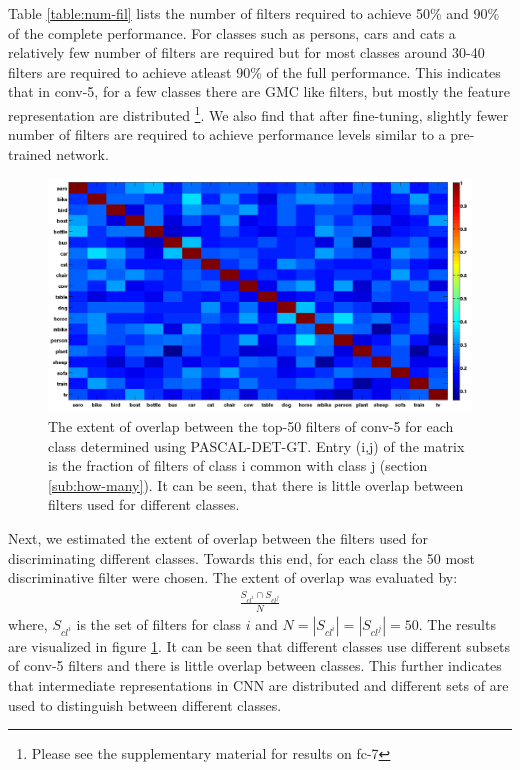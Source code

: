 Table \ref{table:num-fil} lists the number of filters required to achieve 50\% and 90\% of the complete performance. For classes such as persons, cars and cats a relatively few number of filters are required but for most classes around 30-40 filters are required to achieve atleast 90\% of the full performance. This indicates that in conv-5, for a few classes there are GMC like filters, but mostly the feature representation are distributed \footnote{Please see the supplementary material for results on fc-7}. We also find that after fine-tuning, slightly fewer number of filters are required to achieve performance levels similar to a pre-trained network. 

\begin{figure}[t!]
\centering
\includegraphics[width=1.0\linewidth]{images/ftNet_commonfilters.png}
\caption{The extent of overlap between the top-50 filters of conv-5 for each class determined using PASCAL-DET-GT.
Entry (i,j) of the matrix is the fraction of filters of class i common with class j (section \ref{sub:how-many}). It can be seen, that there is little overlap between filters used for different classes.}
\label{fig:overlap}
\end{figure}

Next, we estimated the extent of overlap between the filters used for discriminating different classes. Towards this end, for each class the 50 most discriminative filter were chosen. The extent of overlap was evaluated by:
\begin{align}
\frac{S_{cl^i} \cap S_{cl^j}}{N}
\end{align}
where, $S_{cl^i}$ is the set of filters for class $i$ and $N = |S_{cl^i}| = |S_{cl^j}| = 50$. The results are visualized in figure \ref{fig:overlap}. It can be seen that different classes use different subsets of conv-5 filters and there is little overlap between classes. This further indicates that intermediate representations in CNN are distributed and different sets of are used to distinguish between different classes. 

